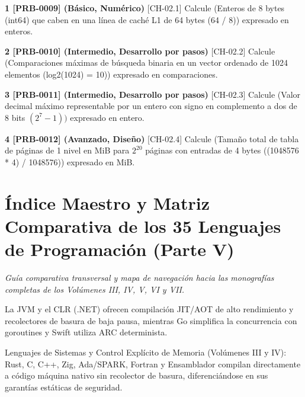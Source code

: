 \documentclass{book}
\begin{document}
\begin{tcolorbox}[title={Ejercicios}, studiumworked, breakable]

\noindent\textbf{1 [PRB-0009] (Básico, Numérico)}
[CH-02.1] Calcule (Enteros de 8 bytes (int64) que caben en una línea de caché L1 de 64 bytes (64 / 8)) expresado en enteros.

\noindent\textbf{2 [PRB-0010] (Intermedio, Desarrollo por pasos)}
[CH-02.2] Calcule (Comparaciones máximas de búsqueda binaria en un vector ordenado de 1024 elementos (log2(1024) = 10)) expresado en comparaciones.

\noindent\textbf{3 [PRB-0011] (Intermedio, Desarrollo por pasos)}
[CH-02.3] Calcule (Valor decimal máximo representable por un entero con signo en complemento a dos de 8 bits \((2^7 - 1))\) expresado en entero.

\noindent\textbf{4 [PRB-0012] (Avanzado, Diseño)}
[CH-02.4] Calcule (Tamaño total de tabla de páginas de 1 nivel en MiB para \(2^20\) páginas con entradas de 4 bytes ((1048576 * 4) / 1048576)) expresado en MiB.
\end{tcolorbox}

\chapter{Índice Maestro y Matriz Comparativa de los 35 Lenguajes de Programación (Parte V)}
\label{chap:ch-03}

\noindent\textit{Guía comparativa transversal y mapa de navegación hacia las monografías completas de los Volúmenes III, IV, V, VI y VII.}

\begin{tcolorbox}[title={Consejo}, studiumtip, breakable]

La JVM y el CLR (.NET) ofrecen compilación JIT/AOT de alto rendimiento y recolectores de basura de baja pausa, mientras Go simplifica la concurrencia con goroutines y Swift utiliza ARC determinista.
\end{tcolorbox}

\begin{tcolorbox}[title={Definición}, studiumdef, breakable]

Lenguajes de Sistemas y Control Explícito de Memoria (Volúmenes III y IV): Rust, C, C++, Zig, Ada/SPARK, Fortran y Ensamblador compilan directamente a código máquina nativo sin recolector de basura, diferenciándose en sus garantías estáticas de seguridad.
\end{tcolorbox}
\end{document}
